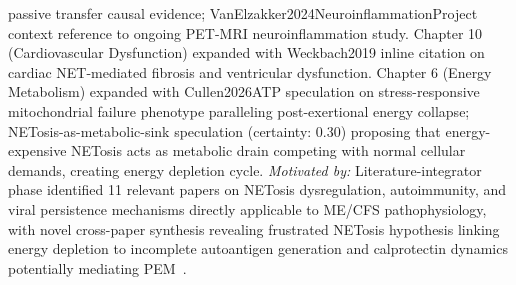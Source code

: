 \begin{itemize}
    passive transfer causal evidence; VanElzakker2024NeuroinflammationProject context
    reference to ongoing PET-MRI neuroinflammation study. Chapter 10 (Cardiovascular
    Dysfunction) expanded with Weckbach2019 inline citation on cardiac NET-mediated
    fibrosis and ventricular dysfunction. Chapter 6 (Energy Metabolism) expanded with
    Cullen2026ATP speculation on stress-responsive mitochondrial failure phenotype
    paralleling post-exertional energy collapse; NETosis-as-metabolic-sink speculation
    (certainty: 0.30) proposing that energy-expensive NETosis acts as metabolic drain
    competing with normal cellular demands, creating energy depletion cycle.
    \textit{Motivated by:} Literature-integrator phase identified 11 relevant papers
    on NETosis dysregulation, autoimmunity, and viral persistence mechanisms directly
    applicable to ME/CFS pathophysiology, with novel cross-paper synthesis revealing
    frustrated NETosis hypothesis linking energy depletion to incomplete autoantigen
    generation and calprotectin dynamics potentially mediating
    PEM~\cite{Krinsky2023,Son2023,Schonrich2016,Monsalve2025,Veras2023,Hetland2022,Weckbach2019,Gao2025LongCovidBiomarkers,GuedesDeSa2024,Peluso2024ViralPersistence,Cullen2026ATP,VanElzakker2024NeuroinflammationProject}.


\end{itemize}
